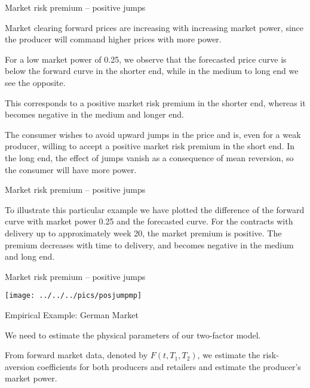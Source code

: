 {Market risk premium -- positive jumps}






	Market clearing
forward prices are increasing with increasing market power, since
the producer will command higher prices with more power.


	For a low market power of 0.25, we observe that the
forecasted price curve is below the forward curve in the shorter
end, while in the medium to long end we see the opposite.


	This
corresponds to a positive market risk premium in the shorter end,
whereas it becomes negative in the medium and longer end.


	The consumer wishes to avoid upward jumps in the price and is, even for a weak producer,
willing to accept a positive market risk premium in
the short end. In the long end, the effect of jumps vanish as a
consequence of mean reversion, so the consumer will have more power.





{Market risk premium -- positive jumps}

To illustrate this particular example we have plotted
the difference of the forward curve with market power 0.25 and the
forecasted curve. For the contracts with
delivery up to approximately week 20, the market premium is
positive. The premium decreases with time to delivery, and becomes
negative in the medium and long end.

{Market risk premium -- positive jumps}

\begin{center}
\texttt{[image: ../../../pics/posjumpmp]}
\end{center}

{Empirical Example: German Market}







	We need to estimate the physical parameters
of our two-factor model.


	From forward market data, denoted by
$F(t,T_1,T_2)$, we estimate the risk-aversion coefficients for both
producers and retailers and estimate the producer's market power.



